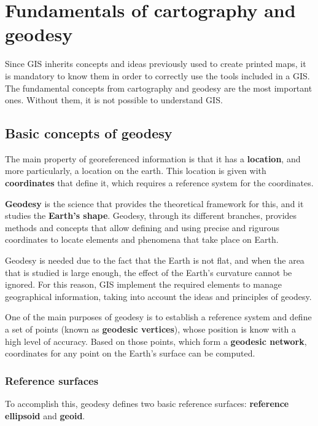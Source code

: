 
\chapter{Fundamentals of cartography and geodesy}

Since GIS inherits concepts and ideas previously used to create printed maps, it is mandatory to know them in order to correctly use the tools included in a GIS. The fundamental concepts from cartography and geodesy are the most important ones. Without them, it is not possible to understand GIS.


\section{Basic concepts of geodesy}
\pagestyle{fancy}

The main property of georeferenced information is that it has a \textbf{location}, and more particularly, a location on the earth. This location is given with \textbf{coordinates} that define it, which requires a reference system for the coordinates.

\textbf{Geodesy} is the science that provides the theoretical framework for this, and it studies the \textbf{Earth's shape}. Geodesy, through its different branches, provides methods and concepts that allow defining and using precise and rigurous coordinates to locate elements and phenomena that take place on Earth.

Geodesy is needed due to the fact that the Earth is not flat, and when the area that is studied is large enough, the effect of the Earth's curvature cannot be ignored. For this reason, GIS implement the required elements to manage geographical information, taking into account the ideas and principles of geodesy.

One of the main purposes of geodesy is to establish a reference system and define a set of points (known as \textbf{geodesic vertices}), whose position is know with a high level of accuracy. Based on those points, which form a \textbf{geodesic network}, coordinates for any point on the Earth's surface can be computed.

\subsection{Reference surfaces}

To accomplish this, geodesy defines two basic reference surfaces: \textbf{reference ellipsoid} and \textbf{geoid}.

